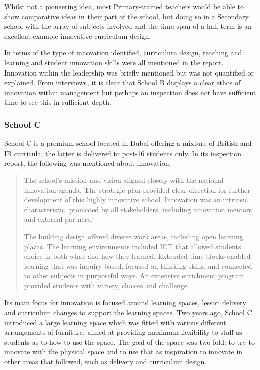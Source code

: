 \documentclass[11pt]{article}
\begin{document}
Whilst not a pioneering idea, most Primary-trained teachers would be able to show comparative ideas in their part of the school, but doing so in a Secondary school with the array of subjects involved and the time span of a half-term is an excellent example innovative curriculum design.

In terms of the type of innovation identified, curriculum design, teaching and learning and student innovation skills were all mentioned in the report. Innovation within the leadership was briefly mentioned but was not quantified or explained. From interviews, it is clear that School B displays a clear ethos of innovation within management but perhaps an inspection does not have sufficient time to see this in sufficient depth. 

\subsubsection{School C}

School C is a premium school located in Dubai offering a mixture of British and IB curricula, the latter is delivered to post-16 students only. In its inspection report, the following was mentioned about innovation:

\begin{quote}
	The school's mission and vision aligned closely with the national innovation agenda. The strategic plan provided clear direction for further development of this highly innovative school. Innovation was an intrinsic characteristic, promoted by all stakeholders, including innovation mentors and external partners.
	
	The building design offered diverse work areas, including open learning plazas. The learning environments included ICT that allowed students choice in both what and how they learned. Extended time blocks enabled learning that was inquiry-based, focused on thinking skills, and connected to other subjects in purposeful ways. An extensive enrichment program provided students with variety, choices and challenge.
\end{quote}

Its main focus for innovation is focused around learning spaces, lesson delivery and curriculum changes to support the learning spaces. Two years ago, School C introduced a large learning space which was fitted with various different arrangements of furniture, aimed at providing maximum flexibility to staff as students as to how to use the space. The goal of the space was two-fold: to try to innovate with the physical space and to use that as inspiration to innovate in other areas that followed, such as delivery and curriculum design. 
\end{document}
